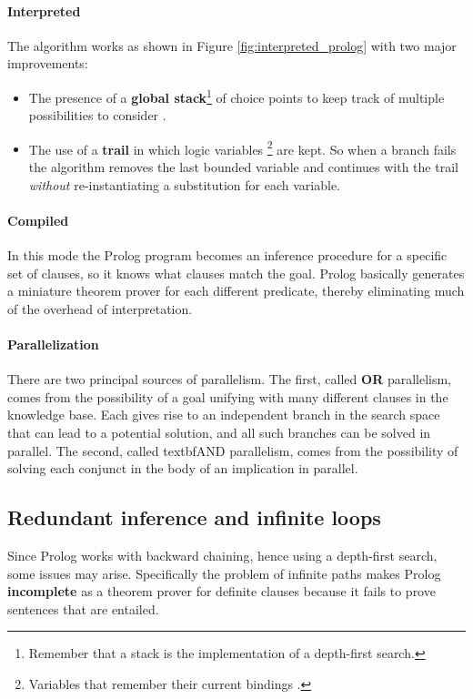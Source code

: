 \documentclass[10pt,a4paper]{article}
\begin{document}
\paragraph{Interpreted}
The algorithm works as shown in Figure \ref{fig:interpreted_prolog} with two major improvements:
\begin{itemize}
\item The presence of a \textbf{global stack}\footnote{Remember that a stack is the implementation of a depth-first search.} of choice points to keep track of multiple possibilities to consider .
\item The use of a \textbf{trail} in which logic variables \footnote{Variables that remember their current bindings .} are kept. So when a branch fails the algorithm removes the last bounded variable and continues with the trail \textit{without} re-instantiating a substitution for each variable.
\end{itemize}


\paragraph{Compiled} In this mode the Prolog program becomes  an inference procedure for a specific set of clauses, so it knows what clauses match the goal. Prolog basically generates a miniature theorem prover for each different predicate, thereby eliminating much of the overhead of interpretation. 

\paragraph{Parallelization} There are two principal sources of parallelism. The first, called \textbf{OR} parallelism, comes from the possibility of a goal unifying with many different clauses in the knowledge base. Each gives rise to an independent branch in the search space that can lead to a potential solution, and all such branches can be solved in parallel. The second, called textbf{AND} parallelism, comes from the possibility of solving each conjunct in the body of an implication in parallel.

\subsection{Redundant inference and infinite loops}
Since Prolog works with backward chaining, hence using a depth-first search, some issues may arise. Specifically the problem of infinite paths makes Prolog \textbf{incomplete} as a theorem prover for definite clauses because it fails to prove sentences that are entailed. 
\end{document}
